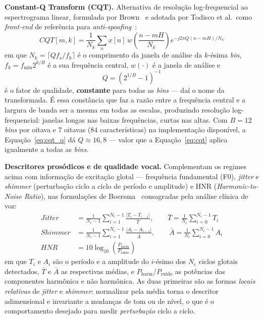 \documentclass[12pt,a4paper]{article}
\begin{document}
\textbf{Constant-Q Transform (CQT).} Alternativa de resolução
log-frequencial ao espectrograma linear, formulada por
Brown~\cite{brown1991cqt} e adotada por Todisco et al.\ como
\textit{front-end} de referência para \textit{anti-spoofing}~\cite{todisco2016new}:
\begin{equation}
	\label{eq:cqt}
	CQT[m,k] = \frac{1}{N_k}\sum_{n} x[n]\, w\!\left(\frac{n - mH}{N_k}\right)
	e^{-j2\pi Q (n - mH)/N_k}
\end{equation}
\noindent
em que $N_k = \lceil Q f_s / f_k \rceil$ é o comprimento da janela de análise
da $k$-ésima \textit{bin}, $f_k = f_{\min}2^{k/B}$ é a sua frequência central,
$w(\cdot)$ é a janela de análise e
\begin{equation}
	\label{eq:cqt_q}
	Q = \left(2^{1/B} - 1\right)^{-1}
\end{equation}
\noindent
é o fator de qualidade, \textbf{constante} para todas as \textit{bins} --- daí
o nome da transformada. É essa constância que faz a razão entre a frequência
central e a largura de banda ser a mesma em todas as escalas, produzindo
resolução log-frequencial: janelas longas nas baixas frequências, curtas nas
altas. Com $B = 12$ \textit{bins} por oitava e $7$ oitavas ($84$
características) na implementação disponível, a Equação~\ref{eq:cqt_q} dá
$Q \approx 16{,}8$ --- valor que a Equação~\ref{eq:cqt} aplica igualmente a
todas as \textit{bins}.

\textbf{Descritores prosódicos e de qualidade vocal.} Complementam os
regimes acima com informação de excitação glotal --- frequência
fundamental (F0), \textit{jitter} e \textit{shimmer} (perturbação
ciclo a ciclo de período e amplitude) e HNR
(\textit{Harmonic-to-Noise Ratio}), nas formulações de
Boersma~\cite{boersma1993accurate} consagradas pela análise clínica de voz:
\begin{align}
	\mathit{Jitter} &= \frac{1}{N_c-1}\sum_{i=1}^{N_c-1}
	\frac{|T_i - T_{i-1}|}{\bar{T}},
	\qquad \bar{T} = \frac{1}{N_c}\sum_{i=0}^{N_c-1} T_i \\
	\mathit{Shimmer} &= \frac{1}{N_c-1}\sum_{i=1}^{N_c-1}
	\frac{|A_i - A_{i-1}|}{\bar{A}},
	\qquad \bar{A} = \frac{1}{N_c}\sum_{i=0}^{N_c-1} A_i \\
	\mathit{HNR} &= 10\log_{10}\!\left(\frac{P_{\mathrm{harm}}}{P_{\mathrm{ruido}}}\right)
\end{align}
\noindent
em que $T_i$ e $A_i$ são o período e a amplitude do $i$-ésimo dos $N_c$ ciclos
glotais detectados, $\bar{T}$ e $\bar{A}$ as respectivas médias, e
$P_{\mathrm{harm}}$/$P_{\mathrm{ruido}}$ as potências das componentes harmônica
e não harmônica. As duas primeiras são as formas \emph{locais relativas} de
\textit{jitter} e \textit{shimmer}: normalizar pela média torna o descritor
adimensional e invariante a mudanças de tom ou de nível, o que é o
comportamento desejado para medir \emph{perturbação} ciclo a ciclo.
\end{document}
